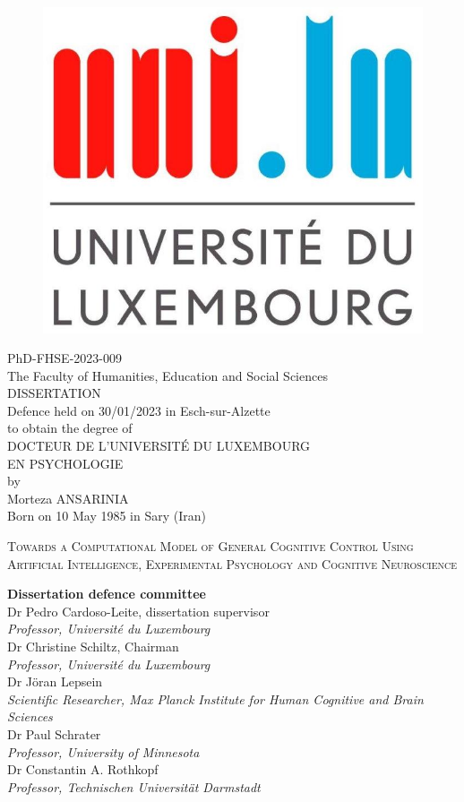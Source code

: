 \thispagestyle{empty}


\begin {center}
\begin{figure}
    \centering
    \includegraphics[width=0.13\columnwidth]{resources/logo_uni.jpg}
\end{figure}

{\footnotesize{PhD-FHSE-2023-009}}\\[-12pt]
{\footnotesize{The Faculty of Humanities, Education and Social Sciences}}\\
\vspace{0.2cm}
\Large{DISSERTATION}\\
\vspace{0.2cm}
{\small Defence held on 30/01/2023 in Esch-sur-Alzette\\[-10pt]to obtain the degree of}\\
\vspace{.2cm}
{\Large DOCTEUR DE L’UNIVERSITÉ DU LUXEMBOURG\\[0pt] EN PSYCHOLOGIE}\\
{\small by}\\
{\Large Morteza ANSARINIA}\\[-20pt]
{\footnotesize Born on 10 May 1985 in Sary (Iran)}\\
\vspace{.2cm}
\begin{spacing}{1.4}
{\scshape \Large Towards a Computational Model of General Cognitive Control Using Artificial Intelligence, Experimental Psychology and Cognitive Neuroscience}
\end{spacing}
\vspace{.2cm}
\end {center}

{\large \bfseries Dissertation defence committee}
\\
{\small Dr Pedro Cardoso-Leite, dissertation supervisor}
\\[-12pt]{\footnotesize \emph{Professor, Université du Luxembourg}}
\\
{\small Dr Christine Schiltz, Chairman}
\\[-12pt]{\footnotesize \emph{Professor, Université du Luxembourg}}
\\
{\small Dr Jöran Lepsein}
\\[-12pt]{\footnotesize \emph{Scientific Researcher, Max Planck Institute for Human Cognitive and Brain Sciences}}
\\
{\small Dr Paul Schrater}
\\[-12pt]{\footnotesize \emph{Professor, University of Minnesota}}
\\
{\small Dr Constantin A. Rothkopf}
\\[-12pt]{\footnotesize \emph{Professor, Technischen Universität Darmstadt}}

\newpage
\restoregeometry

